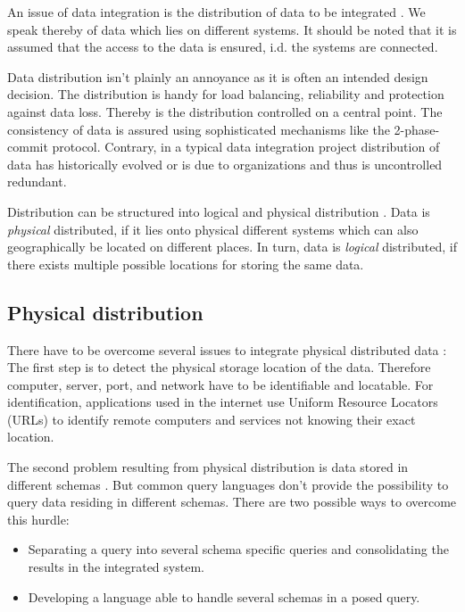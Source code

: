 An issue of data integration is the distribution of data to be integrated \cite[p. 51]{DBLP:books/dp/LeserN2006}. We speak thereby of data which lies on different systems. It should be noted that it is assumed that the access to the data is ensured, i.d. the systems are connected. 

Data distribution isn't plainly an annoyance as it is often an intended design decision\cite[p. 54]{DBLP:books/dp/LeserN2006}. The distribution is handy for load balancing, reliability and protection against data loss. Thereby is the distribution controlled on a central point. 
The consistency of data is assured using sophisticated mechanisms like the 2-phase-commit protocol\cite[p. 54]{DBLP:books/dp/LeserN2006}. Contrary, in a typical data integration project distribution of data has historically evolved or is due to organizations and thus is uncontrolled redundant.

Distribution can be structured into logical and physical distribution \cite[p. 51]{DBLP:books/dp/LeserN2006}. Data is \textit{physical} distributed, if it lies onto physical different systems which can also geographically be located on different places. In turn, data is \textit{logical} distributed, if there exists multiple possible locations for storing the same data. 

\subsection{Physical distribution}
There have to be overcome several issues to integrate physical distributed data \cite[p. 51]{DBLP:books/dp/LeserN2006}: The first step is to detect the physical storage location of the data. Therefore computer, server, port, and network have to be identifiable and locatable. For identification, applications used in the internet use Uniform Resource Locators (URLs) to identify remote computers and services not knowing their exact location.

The second problem resulting from physical distribution is data stored in different schemas \cite[p. 52]{DBLP:books/dp/LeserN2006}. But common query languages don't provide the possibility to query data residing in different schemas. There are two possible ways to overcome this hurdle:
\begin{itemize}
\item Separating a query into several schema specific queries and consolidating the results in the integrated system.
\item Developing a language able to handle several schemas in a posed query.
\end{itemize}

